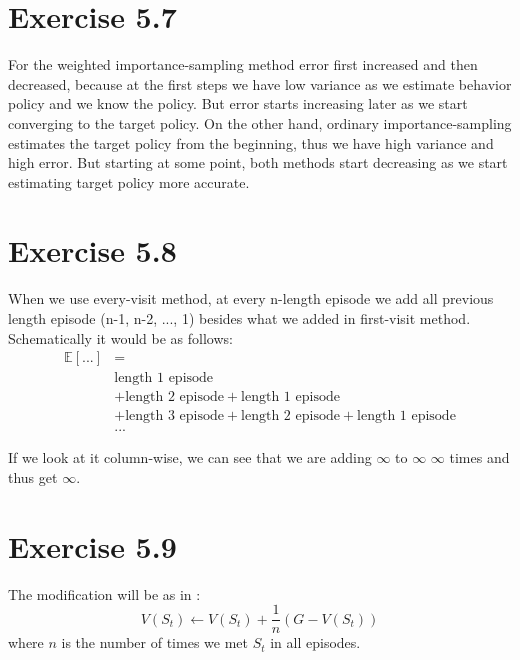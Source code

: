 \documentclass[12pt]{article}
\begin{document}
    \section{Exercise 5.7}
        For the weighted importance-sampling method error first increased and
        then decreased, because at the first steps we have low variance as we
        estimate behavior policy and we know the policy. But error starts increasing
        later as we start converging to the target policy. On the other hand,
        ordinary importance-sampling estimates the target policy from the
        beginning, thus we have high variance and high error. But starting at
        some point, both methods start decreasing as we start estimating target
        policy more accurate.

    \section{Exercise 5.8}
        When we use every-visit method, at every n-length episode we add all previous
        length episode (n-1, n-2, ..., 1) besides what we added in first-visit
        method. Schematically it would be as follows:
        \begin{align*}
            \mathbb{E}[...] &=\\
            & \text{length 1 episode}\\
            & + \text{length 2 episode} + \text{length 1 episode}\\
            & + \text{length 3 episode} + \text{length 2 episode} + \text{length 1 episode}\\
            & ...
        \end{align*}

        If we look at it column-wise, we can see that we are adding $\infty$ to
        $\infty$ $\infty$ times and thus get $\infty$.

    \section{Exercise 5.9}
        The modification will be as in :
        $$V(S_t) \leftarrow V(S_t) + \frac{1}{n}(G - V(S_t))$$
        where $n$ is the number of times we met $S_t$ in all episodes.
\end{document}
